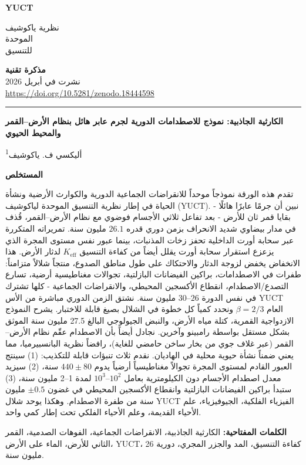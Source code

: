 \documentclass[11pt,a4paper]{article}
\newcommand{\makeheader}{%
	\noindent
	\begin{minipage}{0.17\textwidth}
		\raggedright
		{\sffamily\bfseries\color{skyblue}\fontsize{40}{40}\selectfont YUCT}%
	\end{minipage}%
	\hspace{30pt}
	\begin{minipage}{0.32\textwidth}
		\raggedright
		{\sffamily\fontsize{11}{13}\selectfont نظرية ياكوشيف\\ الموحدة\\ للتنسيق}%
	\end{minipage}%
	\hfill
	\begin{minipage}{0.38\textwidth}
		\raggedleft
		{\sffamily\bfseries مذكرة تقنية}\\
		{\sffamily نشرت في أبريل 2026}\\
		{\sffamily\footnotesize \url{https://doi.org/10.5281/zenodo.18444598}}%
	\end{minipage}
	\par\vspace{5pt}
	\noindent\textcolor{gold}{\rule{\textwidth}{1.6pt}}
	\par\vspace{0pt}
}
\begin{document}
	\thispagestyle{firstpage}
	\makeheader
	
	\vspace{0cm}
	{\LARGE\bfseries الكارثية الجاذبية: نموذج للاصطدامات الدورية لجرم عابر هائل بنظام الأرض–القمر والمحيط الحيوي \par}
	\vspace{0.2cm}
	
	{\large أليكسي ف. ياكوشيف\textsuperscript{1}} \\
	\vspace{0.0cm}
	
	{\color{darkblue}\textbf{\LARGE المستخلص}} \par
	{\large
		\noindent
		تقدم هذه الورقة نموذجاً موحداً للانقراضات الجماعية الدورية والكوارث الأرضية ونشأة الحياة في إطار نظرية التنسيق الموحدة لياكوشيف (YUCT). نبين أن جرمًا عابرًا هائلًا - بقايا قمر ثان للأرض - بعد تفاعل ثلاثي الأجسام فوضوي مع نظام الأرض–القمر، قُذف في مدار بيضاوي شديد الانحراف بزمن دوري قدره \(26.1\) مليون سنة. تمريراته المتكررة عبر سحابة أورت الداخلية تحفز زخات المذنبات، بينما عبور نفس مستوى المجرة الذي يزعزع استقرار سحابة أورت يقلل أيضاً من كفاءة التنسيق \(K_{\mathrm{eff}}\) لدثار الأرض. هذا الانخفاض يخفض لزوجة الدثار والاحتكاك على طول مناطق الصدوع، منتجاً شلالاً متزامناً: طفرات في الاصطدامات، براكين الفيضانات البازلتية، تجوالات مغناطيسية أرضية، تسارع التصدع/الاصطدام، انقطاع الأكسجين المحيطي، والانقراضات الجماعية - كلها تشترك في نفس الدورة \(26\)–\(30\) مليون سنة. نشتق الزمن الدوري مباشرة من الأس YUCT العام \(\beta = 2/3\) ونحدد كمياً كل خطوة في الشلال بصيغ قابلة للاختبار. يشرح النموذج الازدواجية القمرية، كتلة مياه الأرض، والنبض الجيولوجي البالغ 27.5 مليون سنة الموثق بشكل مستقل بواسطة رامبينو وآخرين. نجادل أيضاً بأن الاصطدام عقّم نظام الأرض–القمر (عبر غلاف جوي من بخار ساخن حامضي للغاية)، رافضاً نظرية البانسبيرميا، مما يعني ضمناً نشأة حيوية محلية في الهاديان. نقدم ثلاث تنبؤات قابلة للتكذيب: (1) سينتج العبور القادم لمستوى المجرة تجوالاً مغناطيسياً أرضياً يدوم \(440 \pm 80\) سنة، (2) سيزيد معدل اصطدام الأجسام دون الكيلومترية بعامل \(10^{2}\)–\(10^{3}\) لمدة 1–2 مليون سنة، (3) ستبدأ براكين الفيضانات البازلتية وانقطاع الأكسجين المحيطي في غضون \(\pm 0.5\) مليون سنة من طفرة الاصطدام. وهكذا يوحد شلال YUCT الفيزياء الفلكية، الجيوفيزياء، علم الأحياء القديمة، وعلم الأحياء الفلكي تحت إطار كمي واحد.}
	
	\vspace{0.1cm}
	\noindent
	{\color{darkblue}\textbf{الكلمات المفتاحية:}} الكارثية الجاذبية، الانقراضات الجماعية، الفوهات الصدمية، القمر الثاني للأرض، الماء على الأرض، YUCT، كفاءة التنسيق، المد والجزر المجري، دورية 26 مليون سنة.
	
\end{document}
